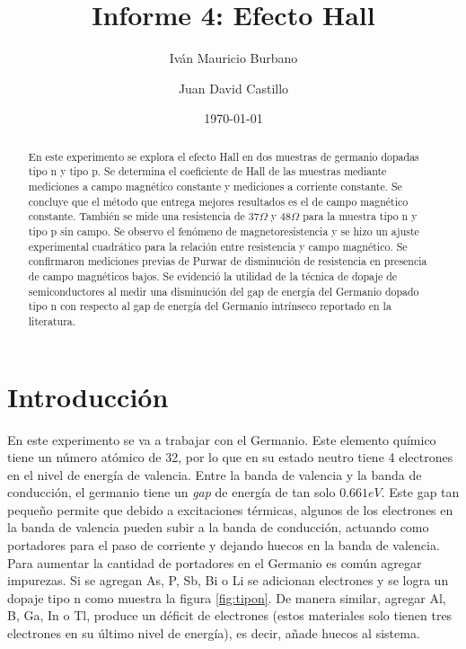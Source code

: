 \documentclass[twocolumn,showkeys,preprintnumbers,amsmath,amssymb]{revtex4}
\begin{document}
\preprint{}

\title{Informe 4: Efecto Hall}

\author{Iván Mauricio Burbano}
\author{Juan David Castillo}

\date{\today}

\begin{abstract}
	
En este experimento se explora el efecto Hall en dos muestras de germanio dopadas tipo n y tipo p. Se determina el coeficiente de Hall de las muestras mediante mediciones a campo magnético constante y mediciones a corriente constante. Se concluye que el método que entrega mejores resultados es el de campo magnético constante. También se mide una resistencia de $37\Omega$ y $48\Omega$ para la muestra tipo n y tipo p sin campo. Se observo el fenómeno de magnetoresistencia y se hizo un ajuste experimental cuadrático para la relación entre resistencia y campo magnético. Se confirmaron mediciones previas de Purwar\cite{bib:Purwar} de disminución de resistencia en presencia de campo magnéticos bajos. Se evidenció la utilidad de la técnica de dopaje de semiconductores al medir una disminución del gap de energía del Germanio dopado tipo n con respecto al gap de energía del Germanio intrínseco reportado en la literatura\cite{bib:Ge}.
	
\end{abstract}


\maketitle

\section{\label{sec:int} Introducción}

	En este experimento se va a trabajar con el Germanio. Este elemento qu\'imico tiene un n\'umero at\'omico de 32, por lo que en su estado neutro tiene 4 electrones en el nivel de energ\'ia de valencia. Entre la banda de valencia y la banda de conducci\'on, el germanio tiene un \textit{gap} de energ\'ia de tan solo $0.661eV$\cite{bib:Ge}. Este gap tan peque\~no permite que debido a excitaciones t\'ermicas, algunos de los electrones en la banda de valencia pueden subir a la banda de conducci\'on, actuando como portadores para el paso de corriente y dejando huecos en la banda de valencia. Para aumentar la cantidad de portadores en el Germanio es com\'un agregar impurezas. Si se agregan As, P, Sb, Bi o Li se adicionan electrones y se logra un dopaje tipo n como muestra la figura \ref{fig:tipon}. De manera similar, agregar Al, B, Ga, In o Tl, produce un d\'eficit de electrones (estos materiales solo tienen tres electrones en su \'ultimo nivel de energ\'ia), es decir, a\~nade huecos al sistema.
\end{document}

